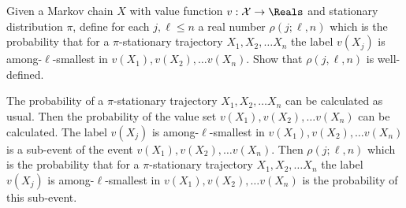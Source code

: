 \documentclass[12pt]{article}
\begin{document}
\begin{exercise}
    Given a Markov chain \( X \) with value function \( v:  \mathcal{X} \to
    \Reals \) and stationary distribution \( \pi \), define for each \(
    j, \ell \le n \) a real number \( \rho(j; \ell, n) \) which is the
    probability that for a \( \pi \)-stationary trajectory \( X_1, X_2,
    \dots X_n \) the label \( v(X_j) \) is among-\( \ell \)-smallest in \( v(X_1),
    v(X_2), \dots v(X_n) \).  Show that \( \rho(j,\ell, n) \) is
    well-defined.  
\end{exercise}
\begin{solution}
  The probability of a \( \pi \)-stationary trajectory \( X_1, X_2,
    \dots X_n \) can be calculated as usual.  Then the probability of
    the value set \( v(X_1), v(X_2), \dots v(X_n) \) can be
    calculated.  The label \( v(X_j) \) is among-\( \ell \)-smallest in \( v(X_1),
    v(X_2), \dots v(X_n) \) is a sub-event of the event \( v(X_1),
    v(X_2), \dots v(X_n) \).  Then \( \rho(j; \ell, n) \) which is the
    probability that for a \( \pi \)-stationary trajectory \( X_1, X_2,
    \dots X_n \) the label \( v(X_j) \) is among-\( \ell \)-smallest in \( v(X_1),
    v(X_2), \dots v(X_n) \) is the probability of this sub-event.
  \end{solution}
  
\end{document}
